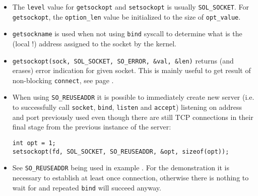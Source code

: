 \begin{itemize}
\item The \texttt{level} value for \texttt{getsockopt} and \texttt{setsockopt}
is usually \verb#SOL_SOCKET#. For \texttt{get\-sock\-opt},
the \texttt{option\_len} value  be initialized to
the size of \texttt{opt\_value}.
\item \texttt{getsockname} is used when not using \texttt{bind} syscall
to determine what is the (local !) address assigned to the socket by the kernel.
\item \verb#getsockopt(sock, SOL_SOCKET, SO_ERROR, &val, &len)# returns
(and erases) error indication for given socket. This is mainly useful to
get result of non-blocking \texttt{connect}, see page \pageref{CONNECT}.
\item When using \verb#SO_REUSEADDR# it is possible to immediately create
new server (i.e. to successfully call \texttt{socket},
\texttt{bind}, \texttt{listen} and \texttt{accept}) listening on address and
port previously used even though there are still TCP connections in their final
stage from the previous instance of the server:

\begin{verbatim}
int opt = 1;
setsockopt(fd, SOL_SOCKET, SO_REUSEADDR, &opt, sizeof(opt));
\end{verbatim}

\item See \verb#SO_REUSEADDR# being used in example .
For the demonstration it is necessary to establish at least once connection,
otherwise there is nothing to wait for and repeated \texttt{bind} will succeed
anyway.
\end{itemize}



